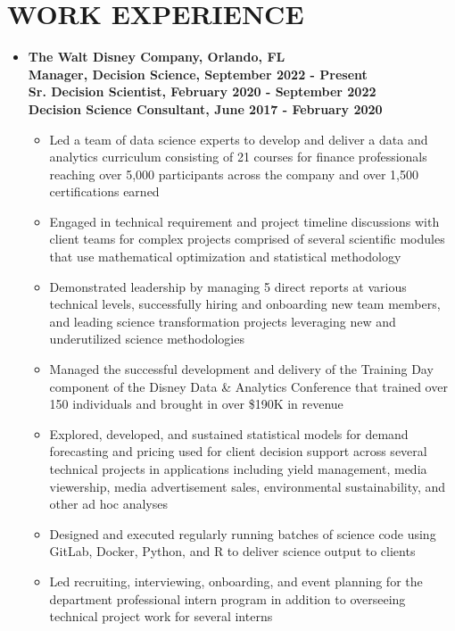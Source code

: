 \documentclass[10pt]{article}
\begin{document}
\section*{WORK EXPERIENCE}
\begin{itemize}
\item[] \textbf{The Walt Disney Company, Orlando, FL\\
Manager, Decision Science, September 2022 - Present \\
Sr. Decision Scientist, February 2020 - September 2022 \\
Decision Science Consultant, June 2017 - February 2020}
\begin{itemize}
\item Led a team of data science experts to develop and deliver a data and analytics curriculum consisting of 21 courses for finance professionals reaching over 5,000 participants across the company and over 1,500 certifications earned
\item Engaged in technical requirement and project timeline discussions with client teams for complex projects comprised of several scientific modules that use mathematical optimization and statistical methodology
\item Demonstrated leadership by managing 5 direct reports at various technical levels, successfully hiring and onboarding new team members, and leading science transformation projects leveraging new and underutilized science methodologies
\item Managed the successful development and delivery of the Training Day component of the Disney Data \& Analytics Conference that trained over 150 individuals and brought in over \$190K in revenue
\item Explored, developed, and sustained statistical models for demand forecasting and pricing used for client decision support across several technical projects in applications including yield management, media viewership, media advertisement sales, environmental sustainability, and other ad hoc analyses 
\item Designed and executed regularly running batches of science code using GitLab, Docker, Python, and R to deliver science output to clients
\item Led recruiting, interviewing, onboarding, and event planning for the department professional intern program in addition to overseeing technical project work for several interns

\end{itemize}
\end{itemize}
\end{document}
